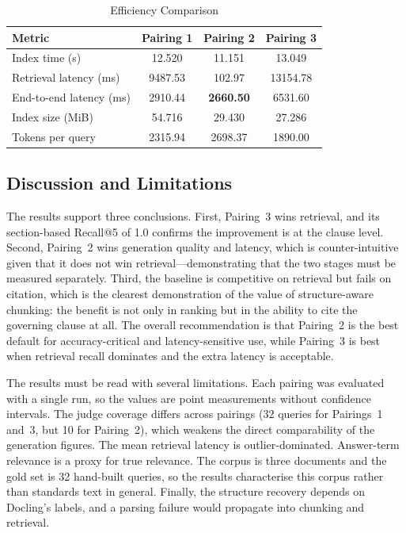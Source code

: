 \documentclass[conference]{IEEEtran}
\begin{document}
\begin{table}[t]
\caption{Efficiency Comparison}
\label{tab:efficiency}
\centering
\begin{tabular}{lccc}
\toprule
Metric & Pairing 1 & Pairing 2 & Pairing 3 \\
\midrule
Index time (s) & 12.520 & 11.151 & 13.049 \\
Retrieval latency (ms) & 9487.53 & 102.97 & 13154.78 \\
End-to-end latency (ms) & 2910.44 & \textbf{2660.50} & 6531.60 \\
Index size (MiB) & 54.716 & 29.430 & 27.286 \\
Tokens per query & 2315.94 & 2698.37 & 1890.00 \\
\bottomrule
\end{tabular}
\end{table}

\subsection{Discussion and Limitations}
The results support three conclusions. First, Pairing~3 wins retrieval, and its section-based Recall@5 of 1.0 confirms the improvement is at the clause level. Second, Pairing~2 wins generation quality and latency, which is counter-intuitive given that it does not win retrieval---demonstrating that the two stages must be measured separately. Third, the baseline is competitive on retrieval but fails on citation, which is the clearest demonstration of the value of structure-aware chunking: the benefit is not only in ranking but in the ability to cite the governing clause at all. The overall recommendation is that Pairing~2 is the best default for accuracy-critical and latency-sensitive use, while Pairing~3 is best when retrieval recall dominates and the extra latency is acceptable.

The results must be read with several limitations. Each pairing was evaluated with a single run, so the values are point measurements without confidence intervals. The judge coverage differs across pairings (32 queries for Pairings~1 and~3, but 10 for Pairing~2), which weakens the direct comparability of the generation figures. The mean retrieval latency is outlier-dominated. Answer-term relevance is a proxy for true relevance. The corpus is three documents and the gold set is 32 hand-built queries, so the results characterise this corpus rather than standards text in general. Finally, the structure recovery depends on Docling's labels, and a parsing failure would propagate into chunking and retrieval.
\end{document}
